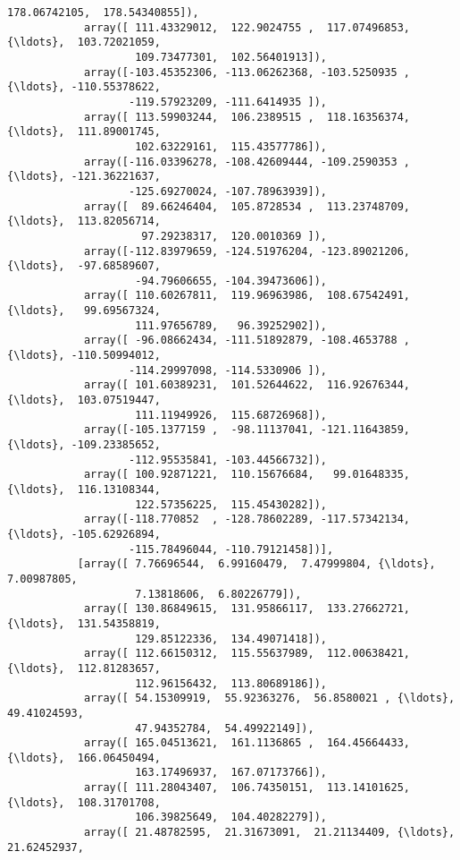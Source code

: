 \documentclass[11pt]{article}
\begin{document}
\begin{Verbatim}[commandchars=\\\{\}]
                    178.06742105,  178.54340855]),
            array([ 111.43329012,  122.9024755 ,  117.07496853, {\ldots},  103.72021059,
                    109.73477301,  102.56401913]),
            array([-103.45352306, -113.06262368, -103.5250935 , {\ldots}, -110.55378622,
                   -119.57923209, -111.6414935 ]),
            array([ 113.59903244,  106.2389515 ,  118.16356374, {\ldots},  111.89001745,
                    102.63229161,  115.43577786]),
            array([-116.03396278, -108.42609444, -109.2590353 , {\ldots}, -121.36221637,
                   -125.69270024, -107.78963939]),
            array([  89.66246404,  105.8728534 ,  113.23748709, {\ldots},  113.82056714,
                     97.29238317,  120.0010369 ]),
            array([-112.83979659, -124.51976204, -123.89021206, {\ldots},  -97.68589607,
                    -94.79606655, -104.39473606]),
            array([ 110.60267811,  119.96963986,  108.67542491, {\ldots},   99.69567324,
                    111.97656789,   96.39252902]),
            array([ -96.08662434, -111.51892879, -108.4653788 , {\ldots}, -110.50994012,
                   -114.29997098, -114.5330906 ]),
            array([ 101.60389231,  101.52644622,  116.92676344, {\ldots},  103.07519447,
                    111.11949926,  115.68726968]),
            array([-105.1377159 ,  -98.11137041, -121.11643859, {\ldots}, -109.23385652,
                   -112.95535841, -103.44566732]),
            array([ 100.92871221,  110.15676684,   99.01648335, {\ldots},  116.13108344,
                    122.57356225,  115.45430282]),
            array([-118.770852  , -128.78602289, -117.57342134, {\ldots}, -105.62926894,
                   -115.78496044, -110.79121458])],
           [array([ 7.76696544,  6.99160479,  7.47999804, {\ldots},  7.00987805,
                    7.13818606,  6.80226779]),
            array([ 130.86849615,  131.95866117,  133.27662721, {\ldots},  131.54358819,
                    129.85122336,  134.49071418]),
            array([ 112.66150312,  115.55637989,  112.00638421, {\ldots},  112.81283657,
                    112.96156432,  113.80689186]),
            array([ 54.15309919,  55.92363276,  56.8580021 , {\ldots},  49.41024593,
                    47.94352784,  54.49922149]),
            array([ 165.04513621,  161.1136865 ,  164.45664433, {\ldots},  166.06450494,
                    163.17496937,  167.07173766]),
            array([ 111.28043407,  106.74350151,  113.14101625, {\ldots},  108.31701708,
                    106.39825649,  104.40282279]),
            array([ 21.48782595,  21.31673091,  21.21134409, {\ldots},  21.62452937,

\end{Verbatim}
\end{document}
